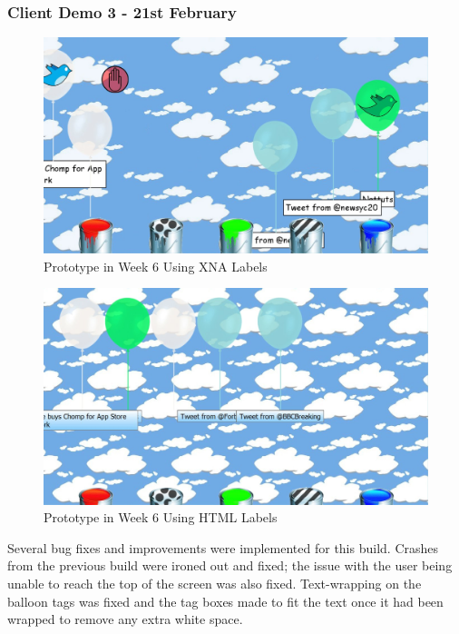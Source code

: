\clearpage{}
\subsubsection{Client Demo 3 - 21st February}
\begin{figure}[h]
\begin{centering}
\includegraphics[width=\textwidth]{Diagrams/Client-Log-W6-XNA.jpg}
\par\end{centering}

\caption{Prototype in Week 6 Using XNA Labels}
\end{figure}
\begin{figure}[p]
\begin{centering}
\includegraphics[width=\textwidth]{Diagrams/Client-Log-W6-HTML.jpg}
\par\end{centering}

\caption{Prototype in Week 6 Using HTML Labels}
\end{figure}
Several bug fixes and improvements were implemented for this build. Crashes 
from the previous build were ironed out and fixed; the issue with the user 
being unable to reach the top of the screen was also fixed. Text-wrapping on 
the balloon tags was fixed and the tag boxes made to fit the text once it had
been wrapped to remove any extra white space.

